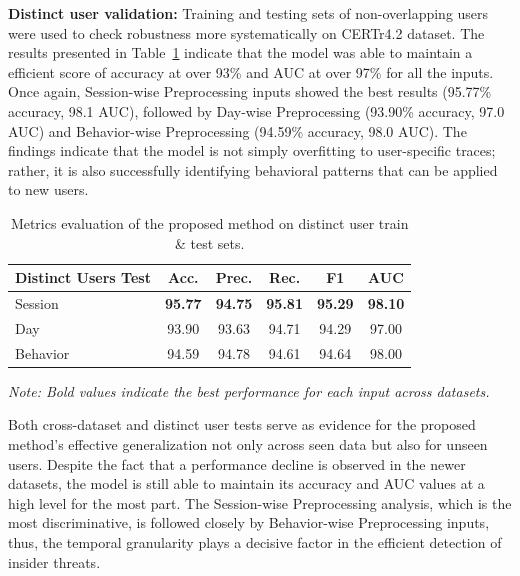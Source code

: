 \textbf{Distinct user validation:}  
Training and testing sets of non-overlapping users were used to check robustness more systematically on CERTr4.2 dataset. The results presented in Table~\ref{table10} indicate that the model was able to maintain a efficient score of accuracy at over 93\% and AUC at over 97\% for all the inputs. Once again, Session-wise Preprocessing inputs showed the best results (95.77\% accuracy, 98.1 AUC), followed by Day-wise Preprocessing (93.90\% accuracy, 97.0 AUC) and Behavior-wise Preprocessing (94.59\% accuracy, 98.0 AUC). The findings indicate that the model is not simply overfitting to user-specific traces; rather, it is also successfully identifying behavioral patterns that can be applied to new users. 
 

\begin{table}[!ht]
\centering
\caption{Metrics evaluation of the proposed method on distinct user train \& test sets.}
\label{table10}
\renewcommand{\arraystretch}{1.3} %
\setlength{\tabcolsep}{5pt}      %
\small
\begin{tabular}{|l|c|c|c|c|c|}
\hline
\textbf{Distinct Users Test} & \textbf{Acc.} & \textbf{Prec.} & \textbf{Rec.} & \textbf{F1} & \textbf{AUC} \\
\hline
Session & \textbf{95.77} & \textbf{94.75} & \textbf{95.81} & \textbf{95.29} & \textbf{98.10} \\
\hline
Day & 93.90 & 93.63 & 94.71 & 94.29 & 97.00 \\
\hline
Behavior & 94.59 & 94.78 & 94.61 & 94.64 & 98.00 \\
\hline
\end{tabular}

\scriptsize{\textit{Note: Bold values indicate the best performance for each input across datasets.}}
\end{table}

Both cross-dataset and distinct user tests serve as evidence for the proposed method's effective generalization not only across seen data but also for unseen users. Despite the fact that a performance decline is observed in the newer datasets, the model is still able to maintain its accuracy and AUC values at a high level for the most part. The Session-wise Preprocessing analysis, which is the most discriminative, is followed closely by Behavior-wise Preprocessing inputs, thus, the temporal granularity plays a decisive factor in the efficient detection of insider threats.

